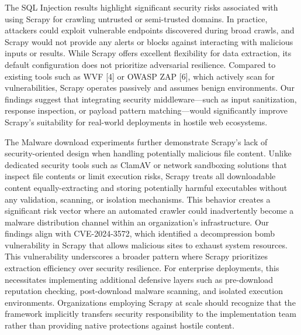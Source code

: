 
The SQL Injection results highlight significant security risks associated with using Scrapy for crawling untrusted or semi-trusted domains. In practice, attackers could exploit vulnerable endpoints discovered during broad crawls, and Scrapy would not provide any alerts or blocks against interacting with malicious inputs or results. While Scrapy offers excellent flexibility for data extraction, its default configuration does not prioritize adversarial resilience.
Compared to existing tools such as WVF [4] or OWASP ZAP [6], which actively scan for vulnerabilities, Scrapy operates passively and assumes benign environments. Our findings suggest that integrating security middleware—such as input sanitization, response inspection, or payload pattern matching—would significantly improve Scrapy’s suitability for real-world deployments in hostile web ecosystems.

The Malware download experiments further demonstrate Scrapy's lack of security-oriented design when handling potentially malicious file content. Unlike dedicated security tools such as ClamAV or network sandboxing solutions that inspect file contents or limit execution risks, Scrapy treats all downloadable content equally-extracting and storing potentially harmful executables without any validation, scanning, or isolation mechanisms. This behavior creates a significant risk vector where an automated crawler could inadvertently become a malware distribution channel within an organization's infrastructure.
Our findings align with CVE-2024-3572, which identified a decompression bomb vulnerability in Scrapy that allows malicious sites to exhaust system resources. This vulnerability underscores a broader pattern where Scrapy prioritizes extraction efficiency over security resilience. For enterprise deployments, this necessitates implementing additional defensive layers such as pre-download reputation checking, post-download malware scanning, and isolated execution environments. Organizations employing Scrapy at scale should recognize that the framework implicitly transfers security responsibility to the implementation team rather than providing native protections against hostile content.

